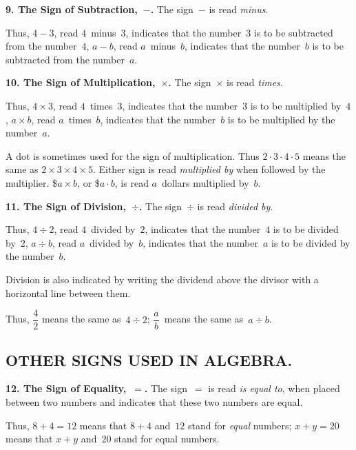 \documentclass[12pt]{book}[2005/09/16]
\newcommand{\Section}[1]{\subsection*{\centering\normalfont\small\scshape #1}}
\newcommand{\Paragraph}[1]{\medskip\par\textbf{#1}}
\newenvironment{Remark}[1][]{\par\small\textsc{#1}}{\par}
\newcommand{\DPtypo}[2]{#2}
\newcommand{\Add}[1]{\DPtypo{}{#1}}
\begin{document}
\Paragraph{9.  The Sign of Subtraction,~$-$\Add{.}} The sign~$-$ is read \emph{minus}.

\begin{Remark}
Thus, $4 - 3$, read $4$~minus~$3$, indicates that the number~$3$ is to be
subtracted from the number~$4$, $a - b$, read $a$~minus~$b$, indicates that
the number~$b$ is to be subtracted from the number~$a$.
\end{Remark}

\Paragraph{10.  The Sign of Multiplication,~$×$\Add{.}} The sign~$×$ is read
\emph{times}.

\begin{Remark}
Thus, $4 × 3$, read $4$~times~$3$, indicates that the number~$3$ is to be
multiplied by~$4$, $a × b$, read $a$~times~$b$, indicates that the number~$b$
is to be multiplied by the number~$a$.
\end{Remark}

A dot is sometimes used for the sign of multiplication.
Thus $2 · 3 · 4 · 5$ means the same as $2 × 3 × 4 × 5$.  Either
sign is read \emph{multiplied by} when followed by the multiplier.
\$$a × b$, or \$$a · b$, is read $a$~dollars multiplied by~$b$.

\Paragraph{11.  The Sign of Division,~$÷$.} The sign~$÷$ is read \emph{divided by}.

\begin{Remark}
Thus, $4 ÷ 2$, read $4$~divided by~$2$, indicates that the number~$4$ is
to be divided by~$2$, $a ÷ b$, read $a$~divided by~$b$, indicates that the
number~$a$ is to be divided by the number~$b$.
\end{Remark}

Division is also indicated by writing the dividend above
the divisor with a horizontal line between them.

\begin{Remark}
Thus, $\dfrac{4}{2}$ means the same as~$4 ÷ 2$; $\dfrac{a}{b}$~means the same as~$a ÷ b$.
\end{Remark}


\Section{OTHER SIGNS USED IN ALGEBRA.}

\Paragraph{12.  The Sign of Equality,~$=$.} The sign~$=$ is read \emph{is equal
to}, when placed between two numbers and indicates that
these two numbers are equal.

\begin{Remark}
Thus, $8 + 4 = 12$ means that $8 + 4$ and~$12$ stand for \emph{equal} numbers;
$x + y = 20$ means that $x + y$ and~$20$ stand for equal numbers.
\end{Remark}
\end{document}
